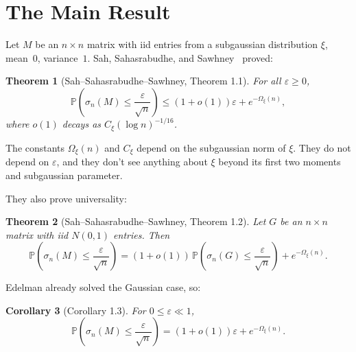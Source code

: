 \documentclass[11pt]{article}
\newtheorem{theorem}{Theorem}[section]
\newtheorem{corollary}[theorem]{Corollary}
\theoremstyle{definition}
\theoremstyle{remark}
\newcommand{\Prob}{\mathbb{P}}
\begin{document}
\section{The Main Result}
\label{sec:main-result}

Let $M$ be an $n \times n$ matrix with iid entries from a subgaussian distribution $\xi$, mean~$0$, variance~$1$. Sah, Sahasrabudhe, and Sawhney~\cite{sah2024spielman} proved:

\begin{theorem}[Sah--Sahasrabudhe--Sawhney, Theorem 1.1]
\label{thm:sss-main}
For all $\varepsilon \ge 0$,
\begin{equation}
  \label{eq:sss-main}
  \Prob\!\left(\sigma_n(M) \le \frac{\varepsilon}{\sqrt{n}}\right)
  \le (1 + o(1))\varepsilon + e^{-\Omega_\xi(n)},
\end{equation}
where $o(1)$ decays as $C_\xi (\log n)^{-1/16}$.
\end{theorem}

The constants $\Omega_\xi(n)$ and $C_\xi$ depend on the subgaussian norm of $\xi$.
They do not depend on $\varepsilon$, and they don't see anything about $\xi$ beyond its first two moments and subgaussian parameter.

They also prove universality:

\begin{theorem}[Sah--Sahasrabudhe--Sawhney, Theorem 1.2]
\label{thm:sss-universality}
Let $G$ be an $n \times n$ matrix with iid $N(0,1)$ entries. Then
\begin{equation}
  \label{eq:sss-universality}
  \Prob\!\left(\sigma_n(M) \le \frac{\varepsilon}{\sqrt{n}}\right)
  = (1 + o(1))\,\Prob\!\left(\sigma_n(G) \le \frac{\varepsilon}{\sqrt{n}}\right)
  + e^{-\Omega_\xi(n)}.
\end{equation}
\end{theorem}

Edelman already solved the Gaussian case, so:

\begin{corollary}[Corollary 1.3]
\label{cor:sss}
For $0 \le \varepsilon \ll 1$,
\begin{equation}
  \label{eq:sss-corollary}
  \Prob\!\left(\sigma_n(M) \le \frac{\varepsilon}{\sqrt{n}}\right)
  = (1 + o(1))\varepsilon + e^{-\Omega_\xi(n)}.
\end{equation}
\end{corollary}
\end{document}
